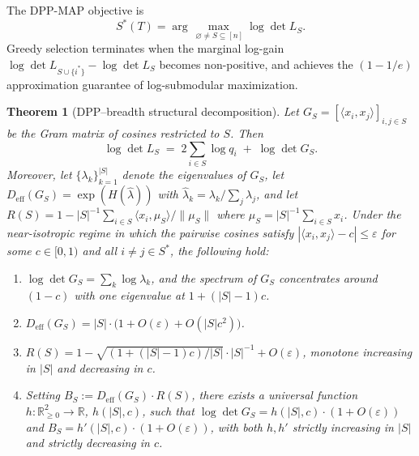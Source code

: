 \documentclass[11pt]{article}
\newtheorem{theorem}{Theorem}
\begin{document}
The DPP-MAP objective is
\[
S^*(T) = \arg\max_{\,\varnothing \neq S \subseteq [n]} \log \det L_S.
\]
Greedy selection terminates when the marginal log-gain $\log \det L_{S \cup \{i^*\}} - \log \det L_S$ becomes non-positive, and achieves the $(1 - 1/e)$ approximation guarantee of log-submodular maximization.

\begin{theorem}[DPP--breadth structural decomposition]\label{thm:dpp-breadth}
Let $G_S = [\langle x_i, x_j \rangle]_{i,j \in S}$ be the Gram matrix of cosines restricted to $S$. Then
\[
\log \det L_S \;=\; 2 \sum_{i \in S} \log q_i \;+\; \log \det G_S.
\]
Moreover, let $\{\lambda_k\}_{k=1}^{|S|}$ denote the eigenvalues of $G_S$, let $D_{\mathrm{eff}}(G_S) = \exp(H(\hat{\lambda}))$ with $\hat{\lambda}_k = \lambda_k / \sum_j \lambda_j$, and let $R(S) = 1 - |S|^{-1}\sum_{i \in S} \langle x_i, \mu_S \rangle / \|\mu_S\|$ where $\mu_S = |S|^{-1} \sum_{i \in S} x_i$. Under the \emph{near-isotropic} regime in which the pairwise cosines satisfy $|\langle x_i, x_j \rangle - c| \leq \varepsilon$ for some $c \in [0, 1)$ and all $i \neq j \in S^*$, the following hold:
\begin{enumerate}
\item[(i)] $\log \det G_S = \sum_k \log \lambda_k$, and the spectrum of $G_S$ concentrates around $(1-c)$ with one eigenvalue at $1 + (|S|-1)c$.
\item[(ii)] $D_{\mathrm{eff}}(G_S) = |S| \cdot \big(1 + O(\varepsilon) + O(|S| c^2)\big)$.
\item[(iii)] $R(S) = 1 - \sqrt{(1 + (|S|-1)c)/|S|} \cdot |S|^{-1} + O(\varepsilon)$, monotone increasing in $|S|$ and decreasing in $c$.
\item[(iv)] Setting $B_S := D_{\mathrm{eff}}(G_S) \cdot R(S)$, there exists a universal function $h: \mathbb{R}_{\geq 0}^2 \to \mathbb{R}$, $h(|S|, c)$, such that $\log \det G_S = h(|S|, c) \cdot (1 + O(\varepsilon))$ and $B_S = h'(|S|, c) \cdot (1 + O(\varepsilon))$, with both $h, h'$ strictly increasing in $|S|$ and strictly decreasing in $c$.
\end{enumerate}
\end{theorem}
\end{document}
